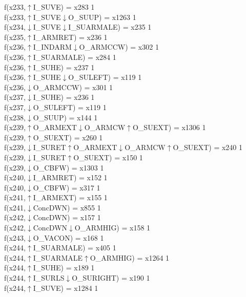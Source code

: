 f(x233,$\uparrow$I\_SUVE) = x283 {1} \\
f(x233,$\uparrow$I\_SUVE$\downarrow$O\_SUUP) = x1263 {1} \\
f(x234,$\downarrow$I\_SUVE$\downarrow$I\_SUARMALE) = x235 {1} \\
f(x235,$\uparrow$I\_ARMRET) = x236 {1} \\
f(x236,$\uparrow$I\_INDARM$\downarrow$O\_ARMCCW) = x302 {1} \\
f(x236,$\uparrow$I\_SUARMALE) = x284 {1} \\
f(x236,$\uparrow$I\_SUHE) = x237 {1} \\
f(x236,$\uparrow$I\_SUHE$\downarrow$O\_SULEFT) = x119 {1} \\
f(x236,$\downarrow$O\_ARMCCW) = x301 {1} \\
f(x237,$\downarrow$I\_SUHE) = x236 {1} \\
f(x237,$\downarrow$O\_SULEFT) = x119 {1} \\
f(x238,$\downarrow$O\_SUUP) = x144 {1} \\
f(x239,$\uparrow$O\_ARMEXT$\downarrow$O\_ARMCW$\uparrow$O\_SUEXT) = x1306 {1} \\
f(x239,$\uparrow$O\_SUEXT) = x260 {1} \\
f(x239,$\downarrow$I\_SURET$\uparrow$O\_ARMEXT$\downarrow$O\_ARMCW$\uparrow$O\_SUEXT) = x240 {1} \\
f(x239,$\downarrow$I\_SURET$\uparrow$O\_SUEXT) = x150 {1} \\
f(x239,$\downarrow$O\_CBFW) = x1303 {1} \\
f(x240,$\downarrow$I\_ARMRET) = x152 {1} \\
f(x240,$\downarrow$O\_CBFW) = x317 {1} \\
f(x241,$\uparrow$I\_ARMEXT) = x155 {1} \\
f(x241,$\downarrow$ConcDWN) = x855 {1} \\
f(x242,$\downarrow$ConcDWN) = x157 {1} \\
f(x242,$\downarrow$ConcDWN$\downarrow$O\_ARMHIG) = x158 {1} \\
f(x243,$\downarrow$O\_VACON) = x168 {1} \\
f(x244,$\uparrow$I\_SUARMALE) = x405 {1} \\
f(x244,$\uparrow$I\_SUARMALE$\uparrow$O\_ARMHIG) = x1264 {1} \\
f(x244,$\uparrow$I\_SUHE) = x189 {1} \\
f(x244,$\uparrow$I\_SURLS$\downarrow$O\_SURIGHT) = x190 {1} \\
f(x244,$\uparrow$I\_SUVE) = x1284 {1} \\
